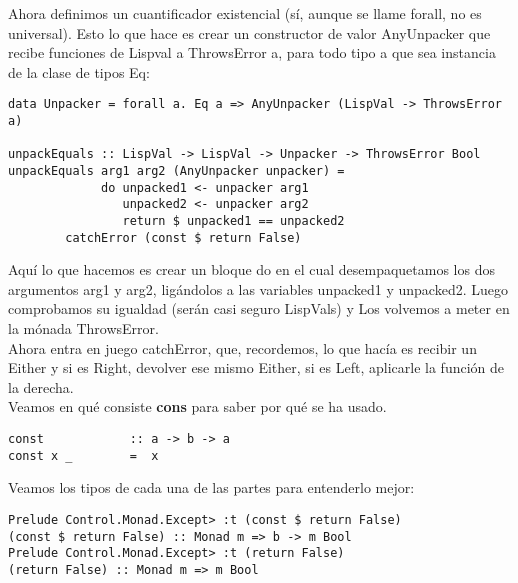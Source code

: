 Ahora definimos un cuantificador existencial (s\'i, aunque se llame forall, no es universal). Esto lo que hace es crear un constructor de valor AnyUnpacker que recibe funciones de Lispval a ThrowsError a, para todo tipo a que sea instancia de la clase de tipos Eq:\\

\begin{minipage}{\linewidth}
\begin{small}
\begin{lstlisting}[frame=single]
data Unpacker = forall a. Eq a => AnyUnpacker (LispVal -> ThrowsError a)

unpackEquals :: LispVal -> LispVal -> Unpacker -> ThrowsError Bool
unpackEquals arg1 arg2 (AnyUnpacker unpacker) = 
             do unpacked1 <- unpacker arg1
                unpacked2 <- unpacker arg2
                return $ unpacked1 == unpacked2
        catchError (const $ return False)
\end{lstlisting}
\end{small}
\end{minipage}

Aqu\'i lo que hacemos es crear un bloque do en el cual desempaquetamos los dos argumentos arg1 y arg2, lig\'andolos a las variables unpacked1 y unpacked2. Luego comprobamos su igualdad (ser\'an casi seguro LispVals) y Los volvemos a meter en la m\'onada ThrowsError.\\

Ahora entra en juego catchError, que, recordemos, lo que hac\'ia es recibir un Either y si es Right, devolver ese mismo Either, si es Left, aplicarle la funci\'on de la derecha.\\

Veamos en qu\'e consiste \textbf{cons} para saber por qu\'e se ha usado.\\

\begin{minipage}{\linewidth}
\begin{small}
\begin{lstlisting}[frame=single]
const            :: a -> b -> a
const x _        =  x
\end{lstlisting}
\end{small}
\end{minipage}

Veamos los tipos de cada una de las partes para entenderlo mejor:\\

\begin{minipage}{\linewidth}
\begin{small}
\begin{lstlisting}[frame=single]
Prelude Control.Monad.Except> :t (const $ return False)
(const $ return False) :: Monad m => b -> m Bool
Prelude Control.Monad.Except> :t (return False)
(return False) :: Monad m => m Bool
\end{lstlisting}
\end{small}
\end{minipage}


